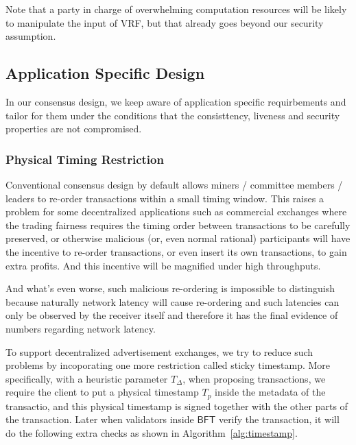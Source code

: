 Note that a party in charge of overwhelming computation resources will be likely to manipulate the input of VRF, but that already goes beyond our security assumption.

\subsection{Application Specific Design}

In our consensus design, we keep aware of application specific requirbements and tailor for them under the conditions that the consisttency, liveness
and security properties are not compromised.

\subsubsection{Physical Timing Restriction}

Conventional consensus design by default allows miners / committee members / leaders to re-order transactions within a small timing window.
This raises a problem for some decentralized applications such as commercial exchanges where the trading fairness requires the timing order between
transactions to be carefully preserved, or otherwise malicious (or, even normal rational) participants will have the incentive to re-order transactions,
or even insert its own transactions, to gain extra profits. And this incentive will be magnified under high throughputs.

And what's even worse, such malicious re-ordering is impossible to distinguish because naturally network latency will cause re-ordering and such latencies
can only be observed by the receiver itself and therefore it has the final evidence of numbers regarding network latency.

To support decentralized advertisement exchanges, we try to reduce such problems by incoporating one more restriction called sticky timestamp.
More specifically, with a heuristic parameter $T_\Delta$, when proposing transactions, we require the client to put a physical timestamp $T_p$ inside
the metadata of the transactio, and this physical timestamp is signed together with the other parts of the transaction. Later when validators inside
$\mathsf{BFT}$ verify the transaction, it will do the following extra checks as shown in Algorithm~\ref{alg:timestamp}.

